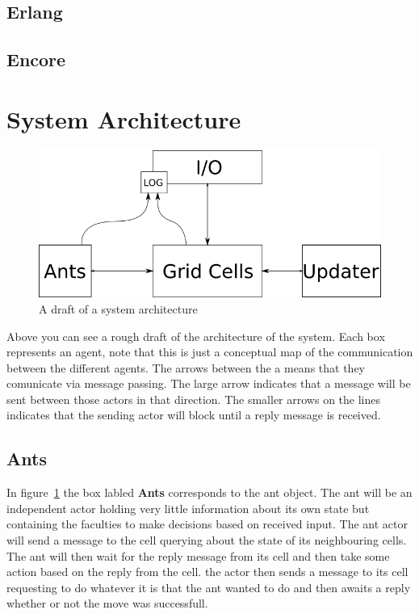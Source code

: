 \documentclass[a4paper]{article}
\begin{document}
\subsection{Erlang}

\subsection{Encore}

\section{System Architecture}

\begin{figure}[h!]
\centerline{
\includegraphics[scale=0.6]{images/architecture.png} 
}
\caption{A draft of a system architecture} 
\label{fig:arch}
\end{figure}
Above you can see a rough draft of the architecture of the system. Each box
represents an agent, note that this is just a conceptual map of the
communication between the different agents. The arrows between the a means that
they comunicate via message passing.
The large arrow indicates that a message will be sent between those actors in that
direction. The smaller arrows on the lines indicates that the sending actor
will block until a reply message is received.

\subsection{Ants}
In figure~\ref{fig:arch} the box labled \textbf{Ants} corresponds to the ant
object.
The ant will be an independent actor holding very little information about its
own state but containing the faculties to make decisions based on received
input. The ant actor will send a message to the cell querying about the state
of its neighbouring cells. The ant will then wait for the reply message from its
cell and then take some action based on the reply from the cell. the actor then
sends a message to its cell requesting to do whatever it is that the ant wanted
to do and then awaits a reply whether or not the move was successfull.
\end{document}
